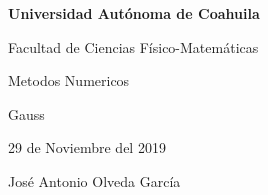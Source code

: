 \documentclass{article}
\begin{document}
\begin{center}
{\Large \textbf{Universidad Autónoma de Coahuila}}
\end{center}

\begin{center}
{\large Facultad de Ciencias Físico-Matemáticas}
\end{center}

\begin{center}
{\large Metodos Numericos}
\end{center}

\begin{center}
{\large Gauss}
\end{center}

\begin{center}
{\large 29 de Noviembre del 2019}
\end{center}

\begin{center}
{\large José Antonio Olveda García}
\end{center}

\vspace{5mm}
\end{document}
